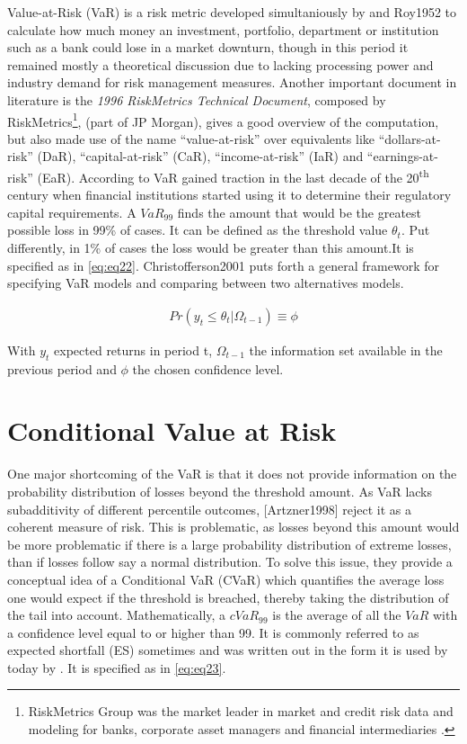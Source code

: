 \documentclass[a4paper, twoside]{templates/ociamthesis}
\begin{document}
Value-at-Risk (VaR) is a risk metric developed simultaniously by \textcite{markowitz1952} and Roy1952 to calculate how much money an investment, portfolio, department or institution such as a bank could lose in a market downturn, though in this period it remained mostly a theoretical discussion due to lacking processing power and industry demand for risk management measures. Another important document in literature is the \emph{1996 RiskMetrics Technical Document}, composed by RiskMetrics\footnote{RiskMetrics Group was the market leader in market and credit risk data and modeling for banks, corporate asset managers and financial intermediaries \autocite{alexander2008}.}, \textcite{morganguarantytrustcompany1996} (part of JP Morgan), gives a good overview of the computation, but also made use of the name ``value-at-risk'' over equivalents like ``dollars-at-risk'' (DaR), ``capital-at-risk'' (CaR), ``income-at-risk'' (IaR) and ``earnings-at-risk'' (EaR). According to \textcite{holton2002} VaR gained traction in the last decade of the 20\textsuperscript{th} century when financial institutions started using it to determine their regulatory capital requirements. A \(VaR_{99}\) finds the amount that would be the greatest possible loss in 99\% of cases. It can be defined as the threshold value \(\theta_t\). Put differently, in 1\% of cases the loss would be greater than this amount.It is specified as in \eqref{eq:eq22}. Christofferson2001 puts forth a general framework for specifying VaR models and comparing between two alternatives models.

\begin{align}
Pr(y_t \le \theta_t | \Omega_{t-1}) \equiv \phi
 \label{eq:eq22}
\end{align}

With \(y_t\) expected returns in period t, \(\Omega_{t-1}\) the information set available in the previous period and \(\phi\) the chosen confidence level.

\hypertarget{conditional-value-at-risk}{%
\section{Conditional Value at Risk}\label{conditional-value-at-risk}}

One major shortcoming of the VaR is that it does not provide information on the probability distribution of losses beyond the threshold amount. As VaR lacks subadditivity of different percentile outcomes, {[}Artzner1998{]} reject it as a coherent measure of risk. This is problematic, as losses beyond this amount would be more problematic if there is a large probability distribution of extreme losses, than if losses follow say a normal distribution. To solve this issue, they provide a conceptual idea of a Conditional VaR (CVaR) which quantifies the average loss one would expect if the threshold is breached, thereby taking the distribution of the tail into account. Mathematically, a \(cVaR_{99}\) is the average of all the \(VaR\) with a confidence level equal to or higher than 99. It is commonly referred to as expected shortfall (ES) sometimes and was written out in the form it is used by today by \autocite{bertsimas2004}. It is specified as in \eqref{eq:eq23}.
\end{document}
